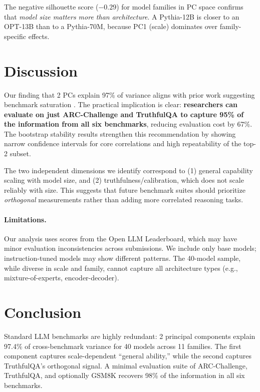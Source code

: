 \documentclass[11pt,a4paper]{article}
\begin{document}
The negative silhouette score ($-0.29$) for model families in PC space confirms that \emph{model size matters more than architecture}. A Pythia-12B is closer to an OPT-13B than to a Pythia-70M, because PC1 (scale) dominates over family-specific effects.

\section{Discussion}

Our finding that 2 PCs explain 97\% of variance aligns with prior work suggesting benchmark saturation \citep{open-llm-leaderboard-blog}. The practical implication is clear: \textbf{researchers can evaluate on just ARC-Challenge and TruthfulQA to capture 95\% of the information from all six benchmarks}, reducing evaluation cost by 67\%. The bootstrap stability results strengthen this recommendation by showing narrow confidence intervals for core correlations and high repeatability of the top-2 subset.

The two independent dimensions we identify correspond to (1) general capability scaling with model size, and (2) truthfulness/calibration, which does not scale reliably with size. This suggests that future benchmark suites should prioritize \emph{orthogonal} measurements rather than adding more correlated reasoning tasks.

\paragraph{Limitations.} Our analysis uses scores from the Open LLM Leaderboard, which may have minor evaluation inconsistencies across submissions. We include only base models; instruction-tuned models may show different patterns. The 40-model sample, while diverse in scale and family, cannot capture all architecture types (e.g., mixture-of-experts, encoder-decoder).

\section{Conclusion}

Standard LLM benchmarks are highly redundant: 2 principal components explain 97.4\% of cross-benchmark variance for 40 models across 11 families. The first component captures scale-dependent ``general ability,'' while the second captures TruthfulQA's orthogonal signal. A minimal evaluation suite of ARC-Challenge, TruthfulQA, and optionally GSM8K recovers 98\% of the information in all six benchmarks.
\end{document}
